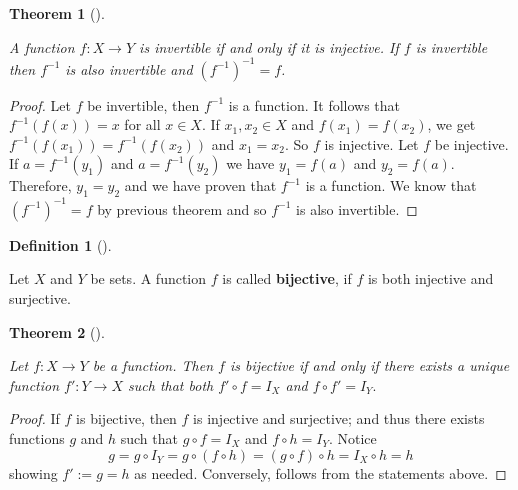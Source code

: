 \documentclass[
  letterpaper,
  10pt,
  reqno,
  twopage,
  openany]{book}
\theoremstyle{plain}
\theoremstyle{definition}
\theoremstyle{definition}
\newtheorem{definition}{Definition}[chapter]
\theoremstyle{definition}
\theoremstyle{plain}
\theoremstyle{plain}
\newtheorem{theorem}{Theorem}[chapter]
\theoremstyle{remark}
\begin{document}
\leavevmode{}%
\begin{theorem}[]\label{thm-invertible-function}

A function \(f:X\to Y\) is invertible if and only if it is injective. If
\(f\) is invertible then \(f^{-1}\) is also invertible and
\((f^{-1})^{-1}=f\).

\end{theorem}

\begin{proof}

Let \(f\) be invertible, then \(f^{-1}\) is a function. It follows that
\(f^{-1}(f(x))=x\) for all \(x\in X\). If \(x_1, x_2\in X\) and
\(f(x_1)=f(x_2)\), we get \(f^{-1}(f(x_1))=f^{-1}(f(x_2))\) and
\(x_1=x_2\). So \(f\) is injective. Let \(f\) be injective. If
\(a=f^{-1}(y_1)\) and \(a=f^{-1}(y_2)\) we have \(y_1 = f(a)\) and
\(y_2 =f(a)\). Therefore, \(y_1=y_2\) and we have proven that \(f^{-1}\)
is a function. We know that \((f^{-1})^{-1}=f\) by previous theorem and
so \(f^{-1}\) is also invertible.

\end{proof}

\leavevmode{}%
\begin{definition}[]\label{def-bijective}

Let \(X\) and \(Y\) be sets. A function \(f\) is called
\textbf{bijective}, if \(f\) is both injective and
surjective.

\end{definition}

\leavevmode{}%
\begin{theorem}[]\label{thm-bijective-unique-function}

Let \(f:X\to Y\) be a function. Then \(f\) is bijective if and only if
there exists a unique function \(f':Y\to X\) such that both
\(f'\circ f=I_X\) and \(f \circ f' = I_Y.\)

\end{theorem}

\begin{proof}

If \(f\) is bijective, then \(f\) is injective and surjective; and thus
there exists functions \(g\) and \(h\) such that \(g\circ f=I_X\) and
\(f \circ h = I_Y.\) Notice \[
g=g \circ I_Y=g \circ (f \circ h)=(g\circ f)\circ h=I_X\circ h=h
\] showing \(f':=g=h\) as needed. Conversely, follows from the
statements above.

\end{proof}
\end{document}
